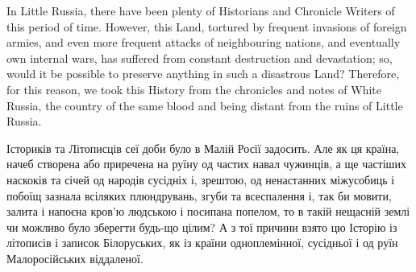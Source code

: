  
 
 
 
 

In Little Russia, there have been plenty of Historians and Chronicle Writers of
this period of time.  However, this Land, tortured by frequent invasions of
foreign armies, and even more frequent attacks of neighbouring nations, and
eventually own internal wars, has suffered from constant destruction and devastation; so, would it
be possible to preserve anything in such a disastrous Land? Therefore, for this
reason, we took this History from the chronicles and notes of White Russia, the
country of the same blood and being distant from the ruins of Little Russia.

Істориків та Літописців сеї доби було в Малій Росії задосить. Але як ця країна,
начеб створена або приречена на руїну од частих навал чужинців, а ще частіших
наскоків та січей од народів сусідніх і, зрештою, од ненастанних міжусобиць і
побоїщ зазнала всіляких плюндрувань, згуби та всеспалення і, так би мовити,
залита і напоєна кров'ю людською і посипана попелом, то в такій нещасній землі
чи можливо було зберегти будь-що цілим? А з тої причини взято цю Історію із
літописів і записок Білоруських, як із країни одноплемінної, сусідньої і од
руїн Малоросійських віддаленої.
